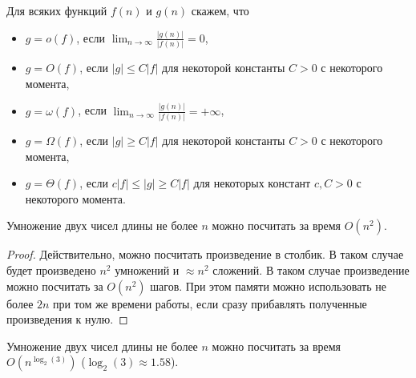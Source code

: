 \documentclass[12pt,a4paper]{article}
\begin{document}
    \begin{definition}
        Для всяких функций $f(n)$ и $g(n)$ скажем, что
        \begin{itemize}
            \item $g = o(f)$, если $\lim_{n \to \infty} \frac{|g(n)|}{|f(n)|} = 0$,
            \item $g = O(f)$, если $|g| \leqslant C|f|$ для некоторой константы $C > 0$ с некоторого момента,
            \item $g = \omega(f)$, если $\lim_{n \to \infty} \frac{|g(n)|}{|f(n)|} = +\infty$,
            \item $g = \Omega(f)$, если $|g| \geqslant C|f|$ для некоторой константы $C > 0$ с некоторого момента,
            \item $g = \Theta(f)$, если $c|f| \leqslant |g| \geqslant C|f|$ для некоторых констант $c, C > 0$ с некоторого момента.
        \end{itemize}
    \end{definition}

    \begin{theorem}
        Умножение двух чисел длины не более $n$ можно посчитать за время $O(n^2)$.
    \end{theorem}

    \begin{proof}
        Действительно, можно посчитать произведение в столбик. В таком случае будет произведено $n^2$ умножений и $\approx n^2$ сложений. В таком случае произведение можно посчитать за $O(n^2)$ шагов. При этом памяти можно использовать не более $2n$ при том же времени работы, если сразу прибавлять полученные произведения к нулю.
    \end{proof}

    \begin{theorem}[Карацуба]
        Умножение двух чисел длины не более $n$ можно посчитать за время $O(n^{\log_2(3)})$ ($\log_2(3) \approx 1.58$).
    \end{theorem}
\end{document}
